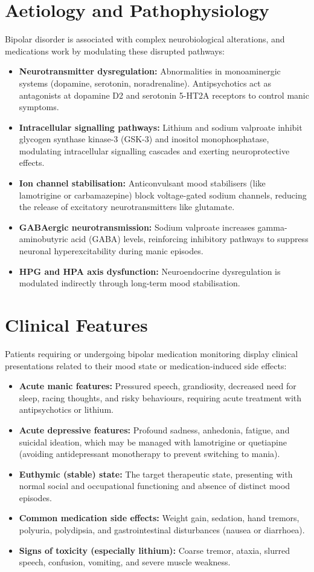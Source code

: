 \section*{Aetiology and Pathophysiology}
Bipolar disorder is associated with complex neurobiological alterations, and medications work by modulating these disrupted pathways:
\begin{itemize}
    \item \textbf{Neurotransmitter dysregulation:} Abnormalities in monoaminergic systems (dopamine, serotonin, noradrenaline). Antipsychotics act as antagonists at dopamine D2 and serotonin 5-HT2A receptors to control manic symptoms.
    \item \textbf{Intracellular signalling pathways:} Lithium and sodium valproate inhibit glycogen synthase kinase-3 (GSK-3) and inositol monophosphatase, modulating intracellular signalling cascades and exerting neuroprotective effects.
    \item \textbf{Ion channel stabilisation:} Anticonvulsant mood stabilisers (like lamotrigine or carbamazepine) block voltage-gated sodium channels, reducing the release of excitatory neurotransmitters like glutamate.
    \item \textbf{GABAergic neurotransmission:} Sodium valproate increases gamma-aminobutyric acid (GABA) levels, reinforcing inhibitory pathways to suppress neuronal hyperexcitability during manic episodes.
    \item \textbf{HPG and HPA axis dysfunction:} Neuroendocrine dysregulation is modulated indirectly through long-term mood stabilisation.
\end{itemize}

\section*{Clinical Features}
Patients requiring or undergoing bipolar medication monitoring display clinical presentations related to their mood state or medication-induced side effects:
\begin{itemize}
    \item \textbf{Acute manic features:} Pressured speech, grandiosity, decreased need for sleep, racing thoughts, and risky behaviours, requiring acute treatment with antipsychotics or lithium.
    \item \textbf{Acute depressive features:} Profound sadness, anhedonia, fatigue, and suicidal ideation, which may be managed with lamotrigine or quetiapine (avoiding antidepressant monotherapy to prevent switching to mania).
    \item \textbf{Euthymic (stable) state:} The target therapeutic state, presenting with normal social and occupational functioning and absence of distinct mood episodes.
    \item \textbf{Common medication side effects:} Weight gain, sedation, hand tremors, polyuria, polydipsia, and gastrointestinal disturbances (nausea or diarrhoea).
    \item \textbf{Signs of toxicity (especially lithium):} Coarse tremor, ataxia, slurred speech, confusion, vomiting, and severe muscle weakness.
\end{itemize}

